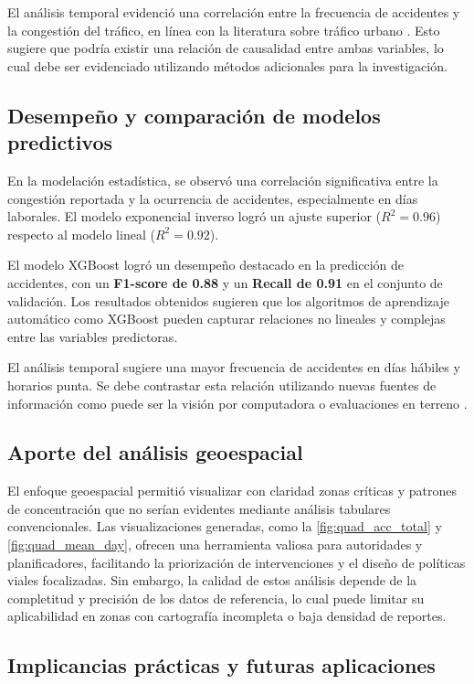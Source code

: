 \documentclass[12pt]{article}
\begin{document}
El análisis temporal evidenció una correlación entre la frecuencia de accidentes y la congestión del tráfico, en línea con la literatura sobre tráfico urbano \parencite{berhanu2024}. Esto sugiere que podría existir una relación de causalidad entre ambas variables, lo cual debe ser evidenciado utilizando métodos adicionales para la investigación.

\subsection{Desempeño y comparación de modelos predictivos}

En la modelación estadística, se observó una correlación significativa entre la congestión reportada y la ocurrencia de accidentes, especialmente en días laborales. El modelo exponencial inverso logró un ajuste superior ($R^2 = 0.96$) respecto al modelo lineal ($R^2 = 0.92$).

El modelo XGBoost logró un desempeño destacado en la predicción de accidentes, con un \textbf{F1-score de 0.88} y un \textbf{Recall de 0.91} en el conjunto de validación. Los resultados obtenidos sugieren que los algoritmos de aprendizaje automático como XGBoost pueden capturar relaciones no lineales y complejas entre las variables predictoras.

El análisis temporal sugiere una mayor frecuencia de accidentes en días hábiles y horarios punta. Se debe contrastar esta relación utilizando nuevas fuentes de información como puede ser la visión por computadora o evaluaciones en terreno \parencite{goodall2019}.

\subsection{Aporte del análisis geoespacial}

El enfoque geoespacial permitió visualizar con claridad zonas críticas y patrones de concentración que no serían evidentes mediante análisis tabulares convencionales. Las visualizaciones generadas, como la \autoref{fig:quad_acc_total} y \autoref{fig:quad_mean_day}, ofrecen una herramienta valiosa para autoridades y planificadores, facilitando la priorización de intervenciones y el diseño de políticas viales focalizadas. Sin embargo, la calidad de estos análisis depende de la completitud y precisión de los datos de referencia, lo cual puede limitar su aplicabilidad en zonas con cartografía incompleta o baja densidad de reportes.

\subsection{Implicancias prácticas y futuras aplicaciones}
\end{document}
